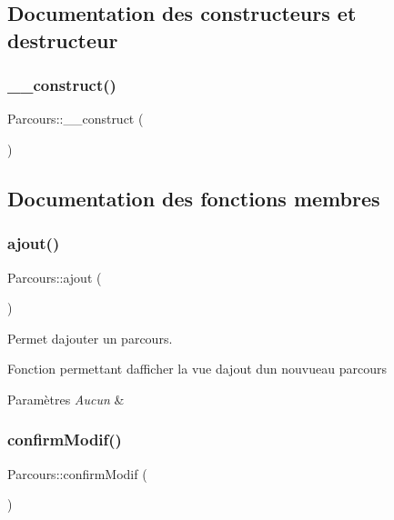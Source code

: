 \subsection{Documentation des constructeurs et destructeur}
\mbox{\label{class_parcours_a77cd45a902eaaed1bef3cede1ce2e993}} 
\subsubsection{\texorpdfstring{\+\_\+\+\_\+construct()}{\_\_construct()}}
{\footnotesize\ttfamily Parcours\+::\+\_\+\+\_\+construct (\begin{DoxyParamCaption}{ }\end{DoxyParamCaption})}



\subsection{Documentation des fonctions membres}
\mbox{\label{class_parcours_abc56a1fefadff06d25b1bdecfd07cf55}} 
\subsubsection{\texorpdfstring{ajout()}{ajout()}}
{\footnotesize\ttfamily Parcours\+::ajout (\begin{DoxyParamCaption}{ }\end{DoxyParamCaption})}



Permet d\textquotesingle{}ajouter un parcours. 

Fonction permettant d\textquotesingle{}afficher la vue d\textquotesingle{}ajout d\textquotesingle{}un nouvueau parcours 
\begin{DoxyParams}{Paramètres}
{\em Aucun} & \\
\hline
\end{DoxyParams}
\mbox{\label{class_parcours_a49d883ceb6b7abd49b5c3d97dac573cb}} 
\subsubsection{\texorpdfstring{confirm\+Modif()}{confirmModif()}}
{\footnotesize\ttfamily Parcours\+::confirm\+Modif (\begin{DoxyParamCaption}{ }\end{DoxyParamCaption})}



